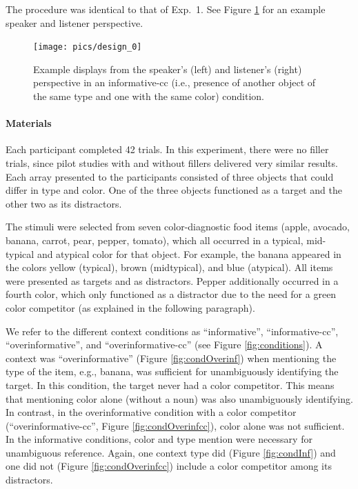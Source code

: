 \documentclass[11pt]{article}
\newcommand{\figref}[1]{Figure \ref{#1}}
\begin{document}
The procedure was identical to that of Exp.~1. See \figref{fig:mturk} for an example speaker and listener perspective.


\begin{figure}[bt!]
	\centering
	\texttt{[image: pics/design\_0]}
	\caption{Example displays from the speaker's (left) and listener's (right) perspective in an informative-cc (i.e., presence of another object of the same type and one with the same color) condition.
	}
	\label{fig:mturk}
\end{figure}

\paragraph{Materials}

Each participant completed 42 trials. In this experiment, there were no filler trials, since pilot studies with and without fillers delivered very similar results. Each array presented to the participants consisted of three objects that could differ in type and color. One of the three objects functioned as a target and the other two as its distractors.

The stimuli were selected from seven color-diagnostic food items (apple, avocado, banana, carrot, pear, pepper, tomato), which all occurred in a typical, mid-typical and atypical color for that object. For example, the banana appeared in the colors yellow (typical), brown (midtypical), and blue (atypical). 
All items were presented as targets and as distractors. Pepper additionally occurred in a fourth color, which only functioned as a distractor due to the need for a green color competitor (as explained in the following paragraph). 

We refer to the different context conditions  as ``informative'', ``informative-cc'', ``overinformative'', and ``overinformative-cc'' (see \figref{fig:conditions}). A context was ``overinformative'' (\figref{fig:condOverinf}) when mentioning the type of the item, e.g., banana, was sufficient for unambiguously identifying the target.  In this condition, the target never had a color competitor. This means that mentioning color alone (without a noun) was also unambiguously identifying. In contrast, in the overinformative condition with a color competitor (``overinformative-cc'', \figref{fig:condOverinfcc}), color alone was not sufficient. In the informative conditions, color and type mention were necessary for unambiguous reference. Again, one context type did (\figref{fig:condInf}) and one did not (\figref{fig:condOverinfcc}) include a color competitor among its distractors.
\end{document}
